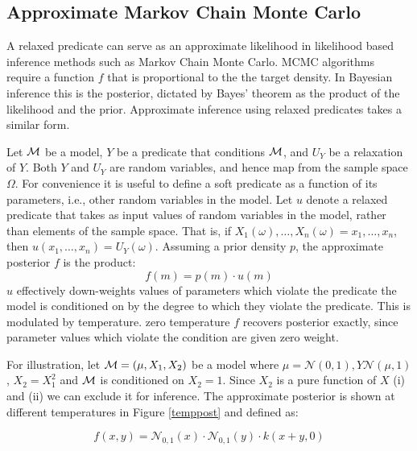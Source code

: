 \subsection{Approximate Markov Chain Monte Carlo}
A relaxed predicate can serve as an approximate likelihood in likelihood based inference methods such as Markov Chain Monte Carlo.
MCMC algorithms require a function $f$ that is proportional to the the target density.
In Bayesian inference this is the posterior, dictated by Bayes' theorem as the product of the likelihood and the prior.
Approximate inference using relaxed predicates takes a similar form.

Let ${\mathcal{M}}$ be a model, $Y$ be a predicate that conditions ${\mathcal{M}}$, and $U_Y$ be a relaxation of $Y$.
Both $Y$ and $U_Y$ are random variables, and hence map from the sample space $\Omega$.
For convenience it is useful to define a soft predicate as a function of its parameters, i.e., other random variables in the model.
Let $u$ denote a relaxed predicate that takes as input values of random variables in the model, rather than elements of the sample space.
That is, if $X_1(\omega), \dots, X_n(\omega) = x_1, \dots, x_n$, then $u(x_1, \dots, x_n) = U_Y(\omega)$.
Assuming a prior density $p$, the approximate posterior $f$ is the product:
\begin{equation}
f(m) = p(m) \cdot u(m)
\end{equation}
$u$ effectively down-weights values of parameters which violate the predicate the model is conditioned on by the  degree to which they violate the predicate. 
This is modulated by temperature.  zero temperature $f$ recovers posterior exactly, since parameter values which violate the condition are given zero weight.

For illustration, let ${\mathcal{M}} = (\mu, X_1, X_2)$ be a model where $\mu = \mathcal{N}(0, 1), Y \mathcal{N}(\mu, 1)$, $X_2 = X_1^2$ and ${\mathcal{M}}$ is conditioned on $X_2 = 1$.
Since $X_2$ is a pure function of $X$ (i) and (ii) we can exclude it for inference.
The approximate posterior is shown at different temperatures in Figure \ref{temppost} and defined as:

\begin{equation}\label{approxposterior}
f(x, y) = \mathcal{N}_{0,1}(x) \cdot \mathcal{N}_{0,1}(y) \cdot k(x + y, 0) 
\end{equation}

